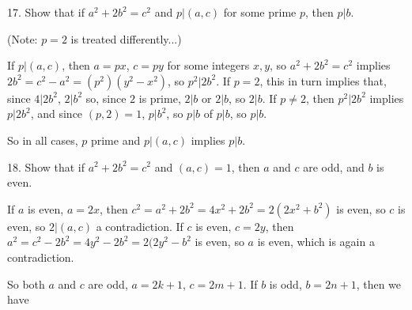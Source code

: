 


\loadmsbm

\ctln{\centerline}
\ssk{\smallskip}
\msk{\medskip}
\bsk{\bigskip}

\overfullrule=0pt
\nopagenumbers




\msk


\bsk

 

\bsk

\item{17.} Show that if $a^2+2b^2=c^2$ and $p|(a,c)$ for some prime $p$, then $p|b$.

\ssk

\item{} (Note: $p=2$ is treated differently...)


\msk

\item{} If $p|(a,c)$, then $a=px$, $c=py$ for some integers $x,y$, so $a^2+2b^2=c^2$ implies $2b^2=c^2-a^2=(p^2)(y^2-x^2)$, so 
$p^2|2b^2$. If $p=2$, this in turn implies that, since $4|2b^2$, $2|b^2$ so, since $2$ is prime, $2|b$ or $2|b$, so $2|b$.
If $p\neq 2$, then $p^2|2b^2$ implies $p|2b^2$, and since $(p,2)=1$, $p|b^2$, so $p|b$ of $p|b$, so $p|b$.

\ssk

\item{} So in all cases, $p$ prime and $p|(a,c)$ implies $p|b$.

\bsk

\item{18.} Show that if $a^2+2b^2=c^2$ and $(a,c)=1$, then $a$ and $c$ are odd, and $b$ is even.

\msk

\item{} If $a$ is even, $a=2x$, then $c^2=a^2+2b^2=4x^2+2b^2=2(2x^2+b^2)$ is even, so $c$ is even, so $2|(a,c)$ a contradiction. 
If $c$ is even, $c=2y$, then
$a^2=c^2-2b^2=4y^2-2b^2=2(2y^2-b^2$ is even, so $a$ is even, which is again a contradiction.

\ssk

\item{} So both $a$ and $c$ are odd, $a=2k+1$, $c=2m+1$.
If $b$ is odd, $b=2n+1$, then we have 

